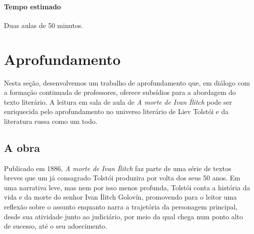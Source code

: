 \documentclass[12pt]{extarticle}
\begin{document}
\paragraph{Tempo estimado} Duas aulas de 50 minutos.


\section{Aprofundamento}




Nesta seção, desenvolvemos um trabalho de aprofundamento que, em diálogo
com a formação continuada de professores, oferece subsídios para a
abordagem do texto literário. A leitura em sala de aula de \emph{A morte
de Ivan Ílitch} pode ser enriquecida pelo aprofundamento no universo
literário de Liev Tolstói e da literatura russa como um todo.

\subsection{A obra}

Publicado em 1886, \emph{A morte de Ivan Ílitch} faz parte de uma série
de textos breves que um já consagrado Tolstói produzira por volta dos
seus 50 anos. Em uma narrativa leve, mas nem por isso
menos profunda, Tolstói conta a história da vida e da morte do senhor
Ivan Ílitch Golovín, promovendo para o leitor uma reflexão sobre o 
assunto enquanto narra a trajetória da personagem
principal, desde sua atividade junto ao judiciário, por meio da qual chega
num ponto alto de sucesso, até o seu adoecimento.
\end{document}
